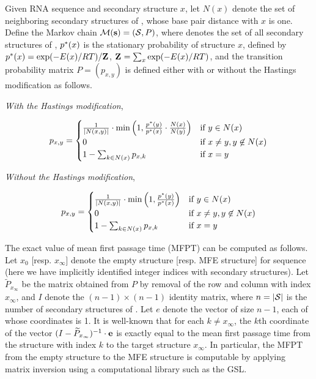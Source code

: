 Given RNA sequence \seq and secondary structure $x$,
let $N(x)$ denote the set of neighboring secondary structures of
\seq, whose base pair distance with $x$ is one. Define the Markov
chain $\mathcal{M}({\bf s})=(\mathcal S,P)$, where \str denotes the
set of all secondary structures of \seq, $p^*(x)$ is the stationary
probability of structure $x$, defined by $p^*(x)=\exp(-E(x)/RT)/{\bf Z}^{}_{}$,
${\bf Z}^{}_{}=\sum_{x} \exp(-E(x)/RT)$, and the transition probability matrix $P
= (p_{x,y})$ is defined either with or without the Hastings
modification as follows.

{\em With the Hastings modification},

\begin{align}
\label{eq:hermes:xitionProbWithHastings}
p_{x,y}=
\begin{cases}
\frac{1}{|N(x,y)|} \cdot \min\left(1, \frac{\pSt(y)}{\pSt(x)} \cdot
\frac{N(x)}{N(y)}\right) & \text{if $y \in N(x)$} \\
0 &\text{if $x \ne y, y \not\in N(x)$} \\
1 - \sum_{k \in N(x)} p_{x,k} & \text{if $x=y$} \\
\end{cases}
\end{align}

{\em Without the Hastings modification},

\begin{align}
\label{eq:hermes:xitionProbWithoutHastings}
p_{x,y}=
\begin{cases}
\frac{1}{|N(x,y)|} \cdot \min\left(1, \frac{\pSt(y)}{\pSt(x)}\right)
& \text{if $y \in N(x)$} \\
0 &\text{if $x \ne y, y \not\in N(x)$} \\
1 - \sum_{k \in N(x)} p_{x,k} & \text{if $x=y$} \\
\end{cases}
\end{align}

The exact value of mean first passage time (MFPT) can be computed as
follows. Let $x_0$ [resp. $x_{\infty}$] denote the empty structure
[resp. MFE structure] for sequence \seq (here we have implicitly
identified integer indices with secondary structures). Let
$\widetilde{P}_{x_{\infty}}$ be the matrix obtained from $P$ by
removal of the row and column with index $x_{\infty}$, and $I$ denote
the $(n-1)\times(n-1)$ identity matrix, where $n=|\mathcal S|$ is the
number of secondary structures of \seq. Let $e$ denote the vector of
size $n-1$, each of whose coordinates is 1. It is well-known
\cite{meyermfpt} that for each $k\ne x_{\infty}$, the $k$th coordinate
of the vector $(I - \widetilde{P}_{x_{\infty}})^{-1} \cdot {\bf e}$ is
exactly equal to the mean first passage time from the structure with
index $k$ to the target structure $x_{\infty}$. In particular, the
MFPT from the empty structure to the MFE structure is computable by
applying matrix inversion using a computational library such as the GSL.

